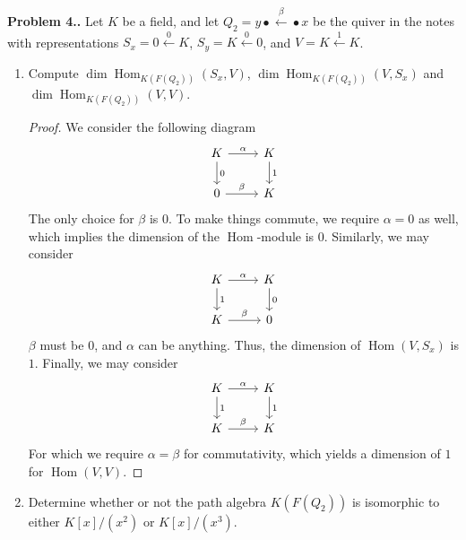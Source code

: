\documentclass[reqno]{amsart}
\DeclareMathOperator{\Hom}{Hom}
\theoremstyle{definition}
\theoremstyle{remark}
\newcommand{\prob}[1] {
  \textbf{Problem #1.}
}
\begin{document}
\prob{4.} Let $K$ be a field, and let $Q_2 = y \bullet \xleftarrow{\beta}
\bullet x$ be the quiver in the notes with representations $S_x = 0
\xleftarrow{0} K$, $S_y = K \xleftarrow{0} 0$, and $V = K \xleftarrow{1} K$.

\begin{enumerate}
  \item Compute $\dim \Hom_{K(F(Q_2))}(S_x, V)$, $\dim \Hom_{K(F(Q_2))}(V, S_x)$
    and $\dim \Hom_{K(F(Q_2))}(V, V)$.
    \begin{proof}
      We consider the following diagram
      \[
        \begin{tikzcd}
          K \ar[d, "0"] \ar[r, "\alpha"] & K \ar[d, "1"] \\
          0 \ar[r, "\beta"] & K
        \end{tikzcd}
      \]
      The only choice for $\beta$ is $0$. To make things commute, we require
      $\alpha = 0$ as well, which implies the dimension of the $\Hom$-module is
      $0$. Similarly, we may consider
      \[
        \begin{tikzcd}
          K \ar[d, "1"] \ar[r, "\alpha"] & K \ar[d, "0"] \\
          K \ar[r, "\beta"] & 0
        \end{tikzcd}
      \]
      $\beta$ must be $0$, and $\alpha$ can be anything. Thus, the dimension of
      $\Hom(V, S_x)$ is $1$. Finally, we may consider
      \[
        \begin{tikzcd}
          K \ar[d, "1"] \ar[r, "\alpha"] & K \ar[d, "1"] \\
          K \ar[r, "\beta"] & K
        \end{tikzcd}
      \]
      For which we require $\alpha=\beta$ for commutativity, which yields a
      dimension of $1$ for $\Hom(V, V)$.
    \end{proof}

  \item Determine whether or not the path algebra $K(F(Q_2))$ is isomorphic to
    either $K[x]/(x^2)$ or $K[x]/(x^3)$.
\end{enumerate}
\end{document}
